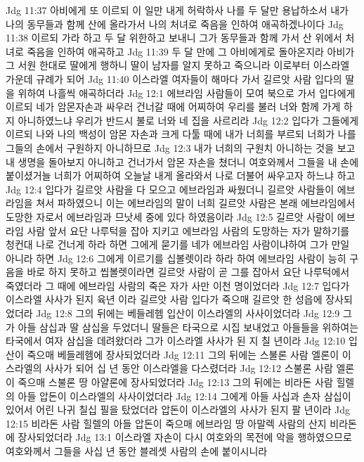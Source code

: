 Jdg 11:37  아비에게 또 이르되 이 일만 내게 허락하사 나를 두 달만 용납하소서 내가 나의 동무들과 함께 산에 올라가서 나의 처녀로 죽음을 인하여 애곡하겠나이다
Jdg 11:38  이르되 가라 하고 두 달 위한하고 보내니 그가 동무들과 함께 가서 산 위에서 처녀로 죽음을 인하여 애곡하고
Jdg 11:39  두 달 만에 그 아비에게로 돌아온지라 아비가 그 서원 한대로 딸에게 행하니 딸이 남자를 알지 못하고 죽으니라 이로부터 이스라엘 가운데 규례가 되어
Jdg 11:40  이스라엘 여자들이 해마다 가서 길르앗 사람 입다의 딸을 위하여 나흘씩 애곡하더라
Jdg 12:1  에브라임 사람들이 모여 북으로 가서 입다에게 이르되 네가 암몬자손과 싸우러 건너갈 때에 어찌하여 우리를 불러 너와 함께 가게 하지 아니하였느냐 우리가 반드시 불로 너와 네 집을 사르리라
Jdg 12:2  입다가 그들에게 이르되 나와 나의 백성이 암몬 자손과 크게 다툴 때에 내가 너희를 부르되 너희가 나를 그들의 손에서 구원하지 아니하므로
Jdg 12:3  내가 너희의 구원치 아니하는 것을 보고 내 생명을 돌아보지 아니하고 건너가서 암몬 자손을 쳤더니 여호와께서 그들을 내 손에 붙이셨거늘 너희가 어찌하여 오늘날 내게 올라와서 나로 더불어 싸우고자 하느냐 하고
Jdg 12:4  입다가 길르앗 사람을 다 모으고 에브라임과 싸웠더니 길르앗 사람들이 에브라임을 쳐서 파하였으니 이는 에브라임의 말이 너희 길르앗 사람은 본래 에브라임에서 도망한 자로서 에브라임과 므낫세 중에 있다 하였음이라
Jdg 12:5  길르앗 사람이 에브라임 사람 앞서 요단 나루턱을 잡아 지키고 에브라임 사람의 도망하는 자가 말하기를 청컨대 나로 건너게 하라 하면 그에게 묻기를 네가 에브라임 사람이냐하여 그가 만일 아니라 하면
Jdg 12:6  그에게 이르기를 십볼렛이라 하라 하여 에브라임 사람이 능히 구음을 바로 하지 못하고 씹볼렛이라면 길르앗 사람이 곧 그를 잡아서 요단 나루턱에서 죽였더라 그 때에 에브라임 사람의 죽은 자가 사만 이천 명이었더라
Jdg 12:7  입다가 이스라엘 사사가 된지 육년 이라 길르앗 사람 입다가 죽으매 길르앗 한 성읍에 장사되었더라
Jdg 12:8  그의 뒤에는 베들레헴 입산이 이스라엘의 사사이었더라
Jdg 12:9  그가 아들 삼십과 딸 삼십을 두었더니 딸들은 타국으로 시집 보내었고 아들들을 위하여는 타국에서 여자 삼십을 데려왔더라 그가 이스라엘 사사가 된 지 칠 년이라
Jdg 12:10  입산이 죽으매 베들레헴에 장사되었더라
Jdg 12:11  그의 뒤에는 스불론 사람 엘론이 이스라엘의 사사가 되어 십 년 동안 이스라엘을 다스렸더라
Jdg 12:12  스불론 사람 엘론이 죽으매 스불론 땅 아얄론에 장사되었더라
Jdg 12:13  그의 뒤에는 비라돈 사람 힐렐의 아들 압돈이 이스라엘의 사사이었더라
Jdg 12:14  그에게 아들 사십과 손자 삼십이 있어서 어린 나귀 칠십 필을 탔었더라 압돈이 이스라엘의 사사가 된지 팔 년이라
Jdg 12:15  비라돈 사람 힐렐의 아들 압돈이 죽으매 에브라임 땅 아말렉 사람의 산지 비라돈에 장사되었더라
Jdg 13:1  이스라엘 자손이 다시 여호와의 목전에 악을 행하였으므로 여호와께서 그들을 사십 년 동안 블레셋 사람의 손에 붙이시니라
